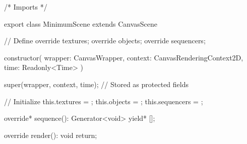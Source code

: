 /* Imports */

export class MinimumScene extends CanvasScene {
    // Define
    override textures;   
    override objects;   
    override sequencers;
    
    constructor(
        wrapper: CanvasWrapper,
        context: CanvasRenderingContext2D,
        time: Readonly<Time>
    ) {
        super(wrapper, context, time); // Stored as protected fields

        // Initialize
        this.textures   = {};
        this.objects    = {};
        this.sequencers = {};
    }

    override* sequence(): Generator<void> {
        yield* [];
    }

    override render(): void {
        return;
    }
}
